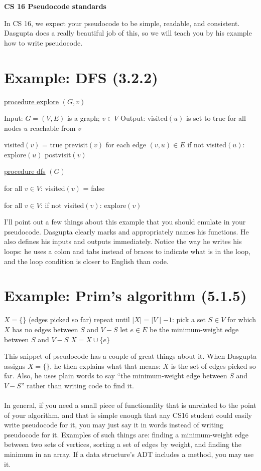 \documentclass[11pt]{article}			%
\begin{document}
\begin{center}
\begin{LARGE}
\textbf{CS 16 Pseudocode standards}
\end{LARGE}
\end{center}
In CS 16, we expect your pseudocode to be simple, readable, and consistent.  Dasgupta does a really beautiful job of this, so we will teach you by his example how to write pseudocode.

\section*{Example: DFS (3.2.2)}
\begin{pseudo}
\underline{procedure explore} $(G, v)$

Input: $G = (V, E)$ is a graph; $v \in V$
Output: visited$(u)$ is set to true for all nodes $u$ reachable from $v$

visited$(v)$ = true
previsit$(v)$
for each edge $(v, u) \in E$
	if not visited$(u)$: explore$(u)$
postvisit$(v)$

\underline{procedure dfs} $(G)$

for all $v \in V$:
	visited$(v)$ = false

for all $v \in V$:
	if not visited$(v)$: explore$(v)$
\end{pseudo}
I'll point out a few things about this example that you should emulate in your pseudocode.  Dasgupta clearly marks and appropriately names his functions.  He also defines his inputs and outputs immediately.  Notice the way he writes his loops: he uses a colon and tabs instead of braces to indicate what is in the loop, and the loop condition is closer to English than code.

\section*{Example: Prim's algorithm (5.1.5)}
\begin{pseudo}
$X = \{\}$ (edges picked so far)
repeat until $\mid X \mid = \mid V \mid - 1$:
	pick a set $S \in V$ for which $X$ has no edges between $S$ and $V - S$
	let $e \in E$ be the minimum-weight edge between $S$ and $V - S$
	$X = X \cup \{e\}$
\end{pseudo}
This snippet of pseudocode has a couple of great things about it.  When Dasgupta assigns $X = \{\}$, he then explains what that means: $X$ is the set of edges picked so far.  Also, he uses plain words to say ``the minimum-weight edge between $S$ and $V - S$'' rather than writing code to find it.\\
\\
In general, if you need a small piece of functionality that is unrelated to the point of your algorithm, and that is simple enough that any CS16 student could easily write pseudocode for it, you may just say it in words instead of writing pseudocode for it.  Examples of such things are: finding a minimum-weight edge between two sets of vertices, sorting a set of edges by weight, and finding the minimum in an array.  If a data structure's ADT includes a method, you may use it.
\end{document}
